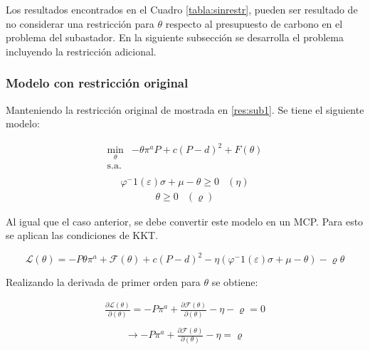 Los resultados encontrados en el Cuadro \ref{tabla:sinrestr}, pueden ser resultado de no considerar una restricción para $\theta$ respecto al presupuesto de carbono en el problema del subastador. En la siguiente subsección se desarrolla el problema incluyendo la restricción adicional.

\subsubsection{Modelo con restricción original}

Manteniendo la restricción original de  mostrada en \ref{res:sub1}. Se tiene el siguiente modelo:

\begin{equation}
\begin{array}{rrclcl}
   \displaystyle \min_{\theta} & -\theta \pi^aP + c(P-d)^2+F(\theta) \\\textrm{s.a.} \label{eq:perforconrestr}\\
\end{array}
\end{equation}
\begin{equation}
\begin{array}{cl}
    \varphi^-1 (\varepsilon )\sigma + \mu - \theta \geq 0 & (\eta)  \label{perforconrestr:r1}
\end{array}
\end{equation}
\begin{equation}
\begin{array}{cl}
    \theta \geq 0 & (\varrho)
\end{array}
\end{equation}

Al igual que el caso anterior, se debe convertir este modelo en un MCP. Para esto se aplican las condiciones de KKT.

$$\mathcal{L}(\theta)=-P\theta\pi^a+\mathcal{F}(\theta)+c(P-d)^2 -\eta(\varphi^-1 (\varepsilon )\sigma + \mu - \theta)- \varrho\theta $$

Realizando la derivada de primer orden para $\theta$ se obtiene:

\begin{equation}
\begin{array}{rrclcl}
    \frac{\partial\mathcal{L}(\theta)}{\partial (\theta)}=-P\pi^a+\frac{\partial\mathcal{F}(\theta)}{\partial(\theta)}-\eta -\varrho=0 \label{lag20}\\
\end{array}
\end{equation}
\begin{equation}
\begin{array}{rrclcl}
    \rightarrow -P\pi^a+\frac{\partial\mathcal{F}(\theta)}{\partial(\theta)}-\eta=\varrho \label{lag21}\\
\end{array}
\end{equation}

